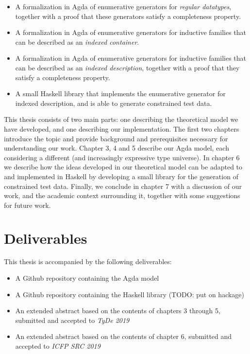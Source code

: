 \documentclass[a4paper,msc,twosized=semi]{uustthesis}
\let\oldemph\emph
\renewcommand\emph[1]{{\large\oldemph{#1}}}
\begin{document}
  \begin{itemize}
    \item 
      A formalization in Agda of enumerative generators for \emph{regular datatypes}, 
      together with a proof that these generators satisfy a completeness property. 

    \item 
      A formalization in Agda of enumerative generators for inductive families that 
      can be described as an \emph{indexed container}. 

    \item 
      A formalization in Agda of enumerative generators for inductive families that 
      can be described as an \emph{indexed description}, together with a proof that 
      they satisfy a completeness property. 

    \item 
      A small Haskell library that implements the enumerative generator for indexed 
      description, and is able to generate constrained test data. 
  \end{itemize}

  This thesis consists of two main parts: one describing the theoretical model we have 
  developed, and one describing our implementation. The first two chapters introduce 
  the topic and provide background and prerequisites necessary for understanding our 
  work. Chapter 3, 4 and 5 describe our Agda model, each considering a different (and
  increasingly expressive type universe). In chapter 6 we describe how the ideas 
  developed in our theoretical model can be adapted to and implemented in Haskell 
  by developing a small library for the generation of constrained test data. Finally, 
  we conclude in chapter 7 with a discussion of our work, and the academic context 
  surrounding it, together with some suggestions for future work. 

\section{Deliverables}

  This thesis is accompanied by the following deliverables: 

  \begin{itemize}
    \item 
      A Github repository containing the Agda model

    \item 
      A Github repository containing the Haskell library (TODO: put on hackage)

    \item 
      An extended abstract based on the contents of chapters 3 through 5, submitted 
      and accepted to \emph{TyDe 2019}

    \item 
      An extended abstract based on the contents of chapter 6, submitted and accepted 
      to \emph{ICFP SRC 2019} 
  \end{itemize}
\end{document}

